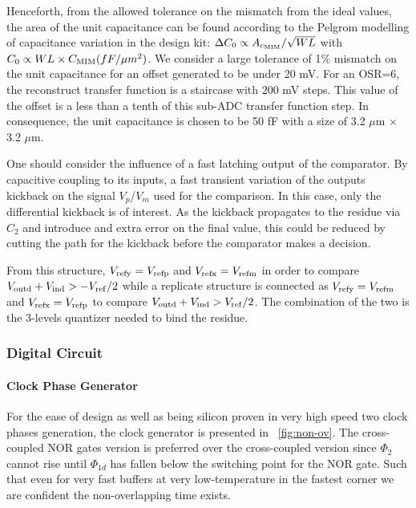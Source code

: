 Henceforth, from the allowed tolerance on the mismatch from the ideal values, the area of the unit capacitance can be found according to the Pelgrom modelling of capacitance variation in the design kit: \(\Delta C_0 \propto A_{c_{\rm MIM}}/\sqrt{WL} \) with \(C_0 \propto WL\times C_{\rm MIM}(fF/\mu m^2)\). We consider a large tolerance of 1\% mismatch on the unit capacitance for an offset generated to be under 20 mV. For an OSR=6, the reconstruct transfer function is a staircase with 200 mV steps. This value of the offset is a less than a tenth of this sub-ADC transfer function step. In consequence, the unit capacitance is chosen to be 50 fF with a size of 3.2 $\mu$m $\times$ 3.2 $\mu$m.

One should consider the influence of a fast latching output of the comparator. By capacitive coupling to its inputs, a fast transient variation of the outputs kickback on the signal \(V_p\)/\(V_m\) used for the comparison. In this case, only the differential kickback is of interest. As the kickback propagates to the residue via \(C_2\) and introduce and extra error on the final value, this could be reduced by cutting the path for the kickback before the comparator makes a decision.

From this structure, \(V_{\rm refy} = V_{\rm refp}\) and \(V_{\rm refx} = V_{\rm refm}\) in order to compare \(V_{\rm outd}+V_{\rm ind} > - V_{\rm ref}/2\) while a replicate structure is connected as \(V_{\rm refy} = V_{\rm refm}\) and \(V_{\rm refx} = V_{\rm refp}\) to compare \(V_{\rm outd}+V_{\rm ind} > V_{\rm ref}/2\). The combination of the two is the 3-levels quantizer needed to bind the residue.

	\subsubsection{Digital Circuit}         %
\paragraph{Clock Phase Generator}   %

For the ease of design as well as being silicon proven in very high speed two clock phases generation, the clock generator is presented in \figurename~\ref{fig:non-ov}. The cross-coupled NOR gates version is preferred over the cross-coupled version since \(\Phi_2 \) cannot rise until \(\Phi_{1d} \) has fallen below
the switching point for the NOR gate. Such that even for very fast buffers at very low-temperature in the fastest corner we are confident the non-overlapping time exists. 
	
